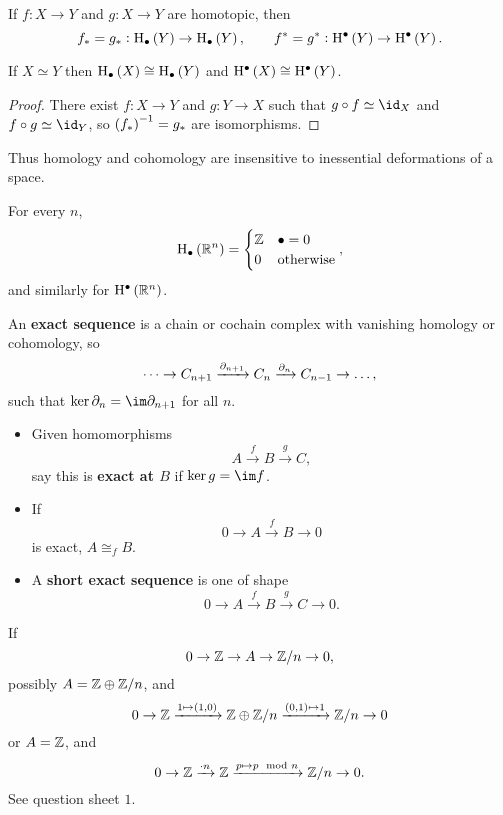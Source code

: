 \begin{theorem}
If $ f : X \to Y $ and $ g : X \to Y $ are homotopic, then
$$ f_* = g_* : \H_\bullet\br{Y} \to \H_\bullet\br{Y}, \qquad f^* = g^* : \H^\bullet\br{Y} \to \H^\bullet\br{Y}. $$
\end{theorem}

\begin{corollary}
If $ X \simeq Y $ then $ \H_\bullet\br{X} \cong \H_\bullet\br{Y} $ and $ \H^\bullet\br{X} \cong \H^\bullet\br{Y} $.
\end{corollary}

\begin{proof}
There exist $ f : X \to Y $ and $ g : Y \to X $ such that $ g \circ f \simeq \id_X $ and $ f \circ g \simeq \id_Y $, so $ \br{f_*}^{-1} = g_* $ are isomorphisms.
\end{proof}

Thus homology and cohomology are insensitive to inessential deformations of a space.

\begin{corollary}
For every $ n $,
$$ \H_\bullet\br{\RR^n} =
\begin{cases}
\ZZ & \bullet = 0 \\
0 & \text{otherwise}
\end{cases},
$$
and similarly for $ \H^\bullet\br{\RR^n} $.
\end{corollary}

\begin{definition*}
An \textbf{exact sequence} is a chain or cochain complex with vanishing homology or cohomology, so
$$ \dots \to C_{n + 1} \xrightarrow{\partial_{n + 1}} C_n \xrightarrow{\partial_n} C_{n - 1} \to \dots, $$
such that $ \ker \da_n = \im \da_{n + 1} $ for all $ n $.
\begin{itemize}
\item Given homomorphisms
$$ A \xrightarrow{f} B \xrightarrow{g} C, $$
say this is \textbf{exact at $ B $} if $ \ker g = \im f $.
\item If
$$ 0 \to A \xrightarrow{f} B \to 0 $$
is exact, $ A \cong_f B $.
\item A \textbf{short exact sequence} is one of shape
$$ 0 \to A \xrightarrow{f} B \xrightarrow{g} C \to 0. $$
\end{itemize}
\end{definition*}

\begin{example*}
If
$$ 0 \to \mathbb{Z} \to A \to \mathbb{Z} / n \to 0, $$
possibly $ A = \mathbb{Z} \oplus \mathbb{Z} / n $, and
$$ 0 \to \ZZ \xrightarrow{1 \mapsto \br{1, 0}} \ZZ \oplus \ZZ / n \xrightarrow{\br{0, 1} \mapsto 1} \ZZ / n \to 0 $$
or $ A = \mathbb{Z} $, and
$$ 0 \to \mathbb{Z} \xrightarrow{\cdot n} \mathbb{Z} \xrightarrow{p \mapsto p \mod n} \mathbb{Z} / n \to 0. $$
See question sheet $ 1 $.
\end{example*}

